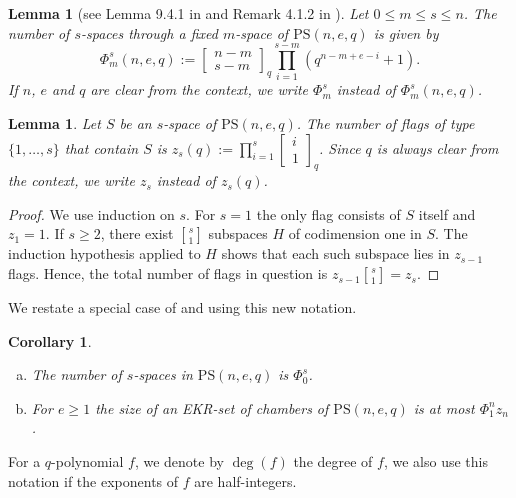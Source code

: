 \documentclass[11pt]{article}
\newtheorem{lemma}[thm]{Lemma}
\newtheorem{cor}[thm]{Corollary}
\newcommand{\Gauss}[2]{{\begin{bmatrix} #1 \\ #2 \end{bmatrix}_q}}
\newcommand{\PS}{\mathrm{PS}}
\newcommand{\red}[1]{\textcolor{red}{#1}}
\newcommand{\philipp}[1]{\textcolor{blue}{#1}}
\renewcommand{\le}{\leqslant}
\renewcommand{\ge}{\geqslant}
\renewcommand{\geq}{\geqslant}
\newcommand{\gauss}[2]{{#1\brack #2}}
\begin{document}
\begin{lemma}[see Lemma 9.4.1 in \cite{distance-regular-graphs} and Remark 4.1.2 in \cite{Vanhove_PhD}] \label{L: extend subspaces} 
Let $0\le m\le  s\le n$. The number of $s$-spaces through a fixed $m$-space of $\PS(n,e,q)$ is given by 
$$ \Phi_m^s(n,e,q):= \Gauss{n-m}{s-m} \prod\limits_{i=1}^{s-m}(q^{n-m+e-i}+1).$$
If $n$, $e$ and $q$ are clear from the context, we write $\Phi_m^s$ instead of $\Phi_m^s(n,e,q)$.
\end{lemma}

\begin{lemma} \label{L:z_s}
    Let $S$ be an $s$-space of $\PS(n,e,q)$. The number of flags of type $\{1,\ldots, s\}$ that contain $S$ is $z_s(q):=\prod\limits_{i=1}^s \Gauss{i}{1}$. Since $q$ is always clear from the context, we write $z_s$ instead of $z_s(q)$.
\end{lemma}

\begin{proof}
We use induction on $s$. For $s=1$ the only flag consists of $S$ itself and $z_1=1$.
If $s \geq 2$, there exist $\gauss{s}{1}$ subspaces $H$ of codimension one in $S$. The induction hypothesis applied to $H$ shows that each such subspace lies in  $z_{s-1}$ flags. Hence, the total number of flags in question is $z_{s-1}\gauss{s}{1}=z_s$. 
\end{proof}



We restate a special case of  and  using this new notation.



\begin{cor} \label{C: Phi}
\begin{enumerate} [(a)]
\item The number of $s$-spaces in $\PS(n,e,q)$ is $\Phi_0^s$.
\item For $e\ge 1$ the size of an EKR-set of chambers of $\PS(n,e,q)$ is at most $\Phi_1^n z_n$.
\end{enumerate}
\end{cor}


For a $q$-polynomial $f$, we denote by $\deg(f)$ the degree of $f$, we also use this notation if the exponents of $f$ are half-integers. 
\end{document}
